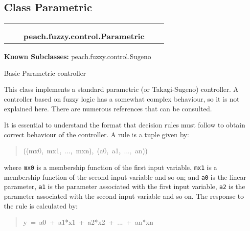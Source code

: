 

\subsection{Class Parametric}

    \label{peach:fuzzy:control:Parametric}
\begin{tabular}{cccccc}
\multicolumn{2}{r}{\settowidth{\BCL}{object}\multirow{2}{\BCL}{object}}
&&
  \\\cline{3-3}
  &&\multicolumn{1}{c|}{}
&&
  \\
&&\multicolumn{2}{l}{\textbf{peach.fuzzy.control.Parametric}}
\end{tabular}

\textbf{Known Subclasses:} peach.fuzzy.control.Sugeno


Basic Parametric controller

This class implements a standard parametric (or Takagi-Sugeno) controller. A
controller based on fuzzy logic has a somewhat complex behaviour, so it is
not explained here. There are numerous references that can be consulted.

It is essential to understand the format that decision rules must follow to
obtain correct behaviour of the controller. A rule is a tuple given by:
\begin{quote}{\ttfamily \raggedright \noindent
((mx0,~mx1,~...,~mxn),~(a0,~a1,~...,~an))
}\end{quote}

where \texttt{mx0} is a membership function of the first input variable, \texttt{mx1}
is a membership function of the second input variable and so on; and \texttt{a0}
is the linear parameter, \texttt{a1} is the parameter associated with the first
input variable, \texttt{a2} is the parameter associated with the second input
variable and so on. The response to the rule is calculated by:
\begin{quote}{\ttfamily \raggedright \noindent
y~=~a0~+~a1*x1~+~a2*x2~+~...~+~an*xn
}\end{quote}

